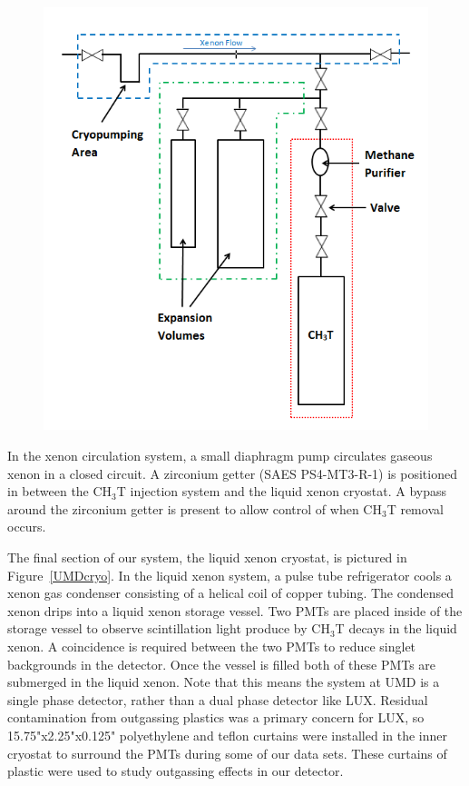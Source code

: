 \begin{figure}
\includegraphics[scale=.6]{UMDInjectionSys.png} 
\label{UMDInjectionSystem}
\end{figure}


In the xenon circulation system, a small diaphragm pump circulates gaseous xenon in a closed circuit.  A zirconium getter (SAES PS4-MT3-R-1) is positioned in between the CH$_3$T injection system and the liquid xenon cryostat.  A bypass around the zirconium getter is present to allow control of when CH$_3$T removal occurs.

The final section of our system, the liquid xenon cryostat, is pictured in Figure~\ref{UMDcryo}. In the liquid xenon system, a pulse tube refrigerator cools a xenon gas condenser consisting of a helical coil of copper tubing. The condensed xenon drips into a liquid xenon storage vessel. Two PMTs are placed inside of the storage vessel to observe scintillation light produce by CH$_3$T decays in the liquid xenon. A coincidence is required between the two PMTs to reduce singlet backgrounds in the detector.  Once the vessel is filled both of these PMTs are submerged in the liquid xenon. Note that this means the system at UMD is a single phase detector, rather than a dual phase detector like LUX.  Residual contamination from outgassing plastics was a primary concern for LUX, so 15.75"x2.25"x0.125" polyethylene and teflon curtains were installed in the inner cryostat to surround the PMTs during some of our data sets. These curtains of plastic were used to study outgassing effects in our detector.

